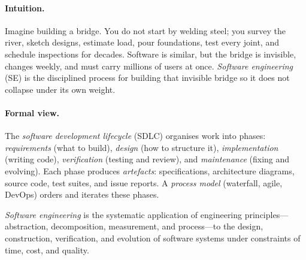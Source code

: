 \paragraph{Intuition.} Imagine building a bridge. You do not start by welding steel; you survey the river, sketch designs, estimate load, pour foundations, test every joint, and schedule inspections for decades. Software is similar, but the bridge is invisible, changes weekly, and must carry millions of users at once. \emph{Software engineering} (SE) is the disciplined process for building that invisible bridge so it does not collapse under its own weight.

\paragraph{Formal view.} The \emph{software development lifecycle} (SDLC) organises work into phases: \emph{requirements} (what to build), \emph{design} (how to structure it), \emph{implementation} (writing code), \emph{verification} (testing and review), and \emph{maintenance} (fixing and evolving). Each phase produces \emph{artefacts}: specifications, architecture diagrams, source code, test suites, and issue reports. A \emph{process model} (waterfall, agile, DevOps) orders and iterates these phases.

\begin{definition}
\emph{Software engineering} is the systematic application of engineering principles---abstraction, decomposition, measurement, and process---to the design, construction, verification, and evolution of software systems under constraints of time, cost, and quality.
\end{definition}

